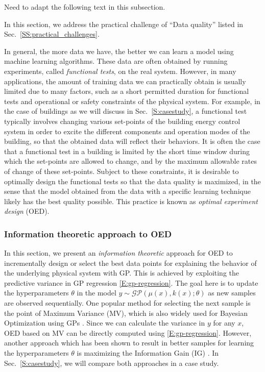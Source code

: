 \iffalse
\begin{todo}
Need to adapt the following text in this subsection.
\end{todo}

In this section, we address the practical challenge of ``Data quality'' listed in Sec.~\ref{SS:practical_challenges}.

In general, the more data we have, the better we can learn a model using machine learning algorithms.
These data are often obtained by running experiments, called \emph{functional tests}, on the real system.
However, in many applications, the amount of training data we can practically obtain is usually limited due to many factors, such as a short permitted duration for functional tests and operational or safety constraints of the physical system.
For example, in the case of buildings as we will discuss in Sec.~\ref{S:casestudy}, a functional test typically involves changing various set-points of the building energy control system in order to excite the different components and operation modes of the building, so that the obtained data will reflect their behaviors.
It is often the case that a functional test in a building is limited by the short time window during which the set-points are allowed to change, and by the maximum allowable rates of change of these set-points.
Subject to these constraints, it is desirable to optimally design the functional tests so that the data quality is maximized, in the sense that the model obtained from the data with a specific learning technique likely has the best quality possible.
This practice is known as \emph{optimal experiment design} (OED).


\subsubsection{Information theoretic approach to OED}

In this section, we present an \emph{information theoretic} approach for OED to incrementally design or select the best data points for explaining the behavior of the underlying physical system with GP.
This is achieved by exploiting the predictive variance in GP regression \eqref{E:gp-regression}.
The goal here is to update the hyperparameters \(\theta\) in the model \(y \sim \mathcal{GP}(\mu(x), k(x); \theta)\) as new samples are observed sequentially.
One popular method for selecting the next sample is the point of Maximum Variance (MV), which is also widely used for Bayesian Optimization using GPs \cite{Snoek2012}.
Since we can calculate the variance in \(y\) for any \(x\), OED based on MV can be directly computed using \eqref{E:gp-regression}.
However, another approach which has been shown to result in better samples for learning the hyperparameters \(\theta\) is maximizing the Information Gain (IG) \cite{Krause2008}. In Sec.~\ref{S:casestudy}, we will compare both approaches in a case study.

